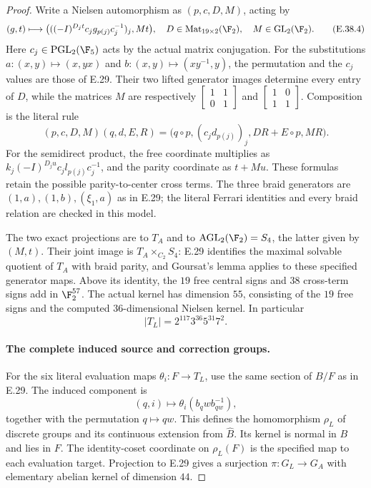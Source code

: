 \begin{proof}
Write a Nielsen automorphism as $(p,c,D,M)$, acting by
\[
 (g,t)\longmapsto
 \bigl(((-I)^{D_jt}c_jg_{p(j)}c_j^{-1})_j,Mt\bigr),
 \quad
 D\in\operatorname{Mat}_{19\times2}(\F_2),\quad
 M\in\operatorname{GL}_2(\F_2).
 \tag{E.38.4}
\]
Here $c_j\in\operatorname{PGL}_2(\F_5)$ acts by the
actual matrix conjugation.  For the substitutions
$a:(x,y)\mapsto(x,yx)$ and
$b:(x,y)\mapsto(xy^{-1},y)$, the permutation and
the $c_j$ values are those of E.29.  Their two
lifted generator images determine every entry of
$D$, while the matrices $M$ are respectively
$\left[\begin{smallmatrix}1&1\\0&1\end{smallmatrix}\right]$
and
$\left[\begin{smallmatrix}1&0\\1&1\end{smallmatrix}\right]$.
Composition is the literal rule
\[
 (p,c,D,M)(q,d,E,R)
   =\bigl(q\circ p,(c_jd_{p(j)})_j,
                  DR+E\circ p,MR\bigr).
 \tag{E.38.5}
\]
For the semidirect product, the free coordinate
multiplies as
$k_j(-I)^{D_ju}c_jl_{p(j)}c_j^{-1}$, and the
parity coordinate as $t+Mu$.
These formulas retain the possible parity-to-center
cross terms.  The three braid generators are
$(1,a),(1,b),(\xi_1,a)$ as in E.29; the literal
Ferrari identities and every braid relation are
checked in this model.

The two exact projections are to $T_A$ and to
$\operatorname{AGL}_2(\F_2)=S_4$, the latter
given by $(M,t)$.  Their joint image is
$T_A\times_{C_2}S_4$: E.29 identifies the maximal
solvable quotient of $T_A$ with braid parity,
and Goursat's lemma applies to these specified
generator maps.  Above its identity, the $19$
free central signs and $38$ cross-term signs
add in $\F_2^{57}$.  The actual kernel has
dimension $55$, consisting of the $19$ free
signs and the computed $36$-dimensional Nielsen
kernel.  In particular
\[
             |T_L|=2^{117}3^{36}5^{31}7^2.
 \tag{E.38.6}
\]

\paragraph{The complete induced source and correction groups.}
For the six literal evaluation maps
$\theta_i:F\to T_L$, use the same section of
$B/F$ as in E.29.  The induced component is
\[
 (q,i)\longmapsto\theta_i(b_qwb_{qw}^{-1}),
 \tag{E.38.7}
\]
together with the permutation $q\mapsto qw$.
This defines the homomorphism $\rho_L$ of discrete
groups and its continuous extension from $\widehat B$.
Its kernel is normal in $B$ and lies in $F$.
The identity-coset coordinate on $\rho_L(F)$ is
the specified map to each evaluation target.
Projection to E.29 gives a surjection
$\pi:G_L\to G_A$ with elementary abelian kernel
of dimension $44$.


\end{proof}
